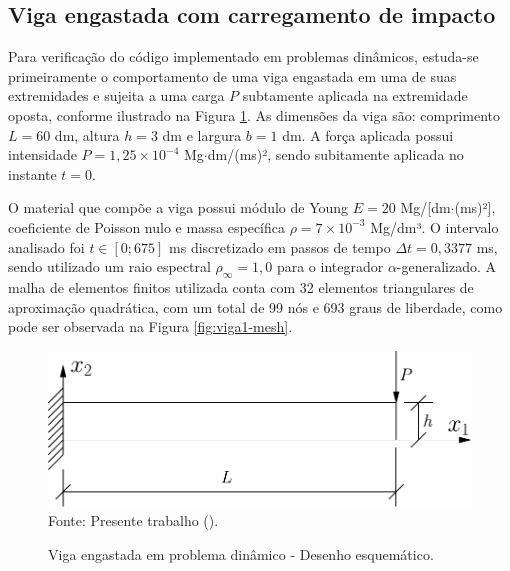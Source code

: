 \subsection{Viga engastada com carregamento de impacto} \label{Ap:DinBeam}

Para verificação do código implementado em problemas dinâmicos, estuda-se  primeiramente o comportamento de uma viga engastada em uma de suas extremidades e sujeita a uma carga $P$ subtamente aplicada na extremidade oposta, conforme ilustrado na Figura \ref{fig:viga1}. As dimensões da viga são: comprimento $L=60$ dm, altura $h=3$ dm e largura $b=1$ dm. A força aplicada possui intensidade $P=1,25\times10^{-4}$ Mg$\cdot$dm/(ms)², sendo subitamente aplicada no instante $t=0$.

O material que compõe a viga possui módulo de Young $E=20$ Mg/[dm$\cdot$(ms)²], coeficiente de Poisson nulo e massa específica $\rho=7\times10^{-3}$ Mg/dm³. O intervalo analisado foi $t\in[0;675]$ ms discretizado em passos de tempo $\Delta t=0,3377$ ms, sendo utilizado um raio espectral $\rho_\infty=1,0$ para o integrador $\alpha$-generalizado. A malha de elementos finitos utilizada conta com 32 elementos triangulares de aproximação quadrática, com um total de 99 nós e 693 graus de liberdade, como pode ser observada na Figura \ref{fig:viga1-mesh}.

\begin{figure}[h!]
    \centering
    \caption{Viga engastada em problema dinâmico - Desenho esquemático.}
    \includegraphics[width=0.5\linewidth]{Figuras/vigas/viga1.pdf}
    \\Fonte: Presente trabalho (\the\year).
    \label{fig:viga1}
\end{figure}

